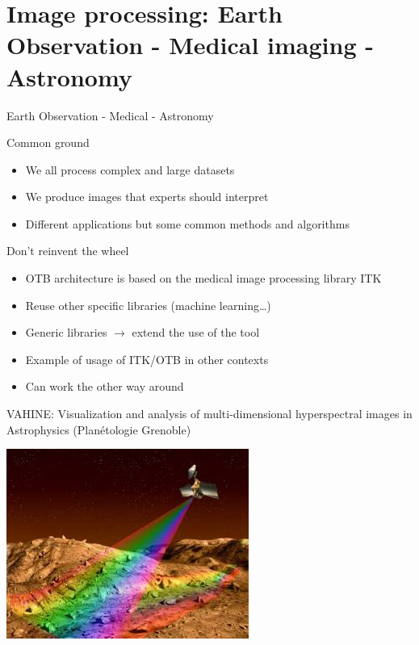 \section{Image processing: Earth Observation - Medical imaging - Astronomy}

\begin{frame}{Earth Observation - Medical - Astronomy}

  \begin{block}{Common ground}
    \begin{itemize}
    \item We all process complex and large datasets
    \item We produce images that experts should interpret
    \item Different applications but some common methods and algorithms
    \end{itemize}
  \end{block}

  \begin{block}{Don't reinvent the wheel}
    \begin{itemize}
    \item OTB architecture is based on the medical image processing library ITK
    \item Reuse other specific libraries (machine learning\ldots)
    \item Generic libraries $\rightarrow$ extend the use of the tool  
    \item Example of usage of ITK/OTB in other contexts 
    \item Can work the other way around
    \end{itemize}
  \end{block}

\end{frame}

\begin{frame}{VAHINE: Visualization and analysis of multi-dimensional
    hyperspectral images in Astrophysics (Planétologie Grenoble)}
  \begin{center}
    \includegraphics[keepaspectratio,height=0.6\paperheight]{images/crism-mars.jpg}
  \end{center}  
\end{frame}

